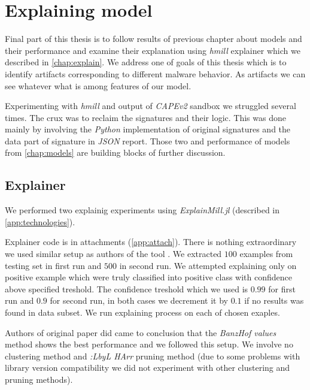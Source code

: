 \chapter{Explaining model} \label{chap:expex}
Final part of this thesis is to follow results of previous chapter about models and their performance and examine their explanation using \emph{hmill} explainer \cite{Pevny2020} which we described in \ref{chap:explain}. We address one of goals of this thesis which is to identify artifacts corresponding to different malware behavior. As artifacts we can see whatever what is among features of our model.

Experimenting with \emph{hmill} and output of \emph{CAPEv2} sandbox we struggled several times. The crux was to reclaim the signatures and their logic. This was done mainly by involving the \emph{Python} implementation of original signatures and the data part of signature in \emph{JSON} report. Those two and performance of models from \ref{chap:models} are building blocks of further discussion.


\section{Explainer}
We performed two explainig experiments using \emph{ExplainMill.jl} (described in \ref{app:technologies}). 

Explainer code is in attachments (\ref{app:attach}). There is nothing extraordinary we used similar setup as authors of the tool \cite{Pevny2020}. We extracted $100$ examples from testing set in first run and $500$ in second run. We attempted explaining only on positive example which were truly classified into positive class with confidence above specified treshold. The confidence treshold which we used is $0.99$ for first run and $0.9$ for second run, in both cases we decrement it by $0.1$ if no results was found in data subset. We run explaining process on each of chosen exaples.

Authors of original paper did came to conclusion that the \emph{BanzHof values} method shows the best performance and we followed this setup. We involve no clustering method and \emph{:LbyL HArr}  pruning method (due to some problems with library version compatibility we did not experiment with other clustering and pruning methods).

